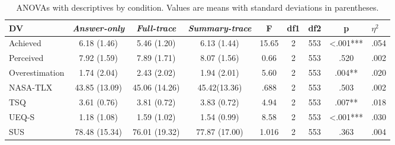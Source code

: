 \documentclass[manuscript,review,anonymous]{acmart}
\begin{document}
\begin{table}[!htp]
\centering
\caption{ANOVAs with descriptives by condition. Values are means with standard deviations in parentheses.}

\begin{tabular}{lcccccccc}
\hline
DV                    & \textit{Answer-only}             & \textit{Full-trace}                 & \textit{Summary-trace} & F & df1 & df2 & p & \multicolumn{1}{l}{$\eta^2$} \\ \hline
Achieved  &    6.18 (1.46)      &      5.46 (1.20)     &      6.13 (1.44)           &       15.65           &              2        &      553                &      <.001***           &            .054         \\
Perceived &    7.92 (1.59)      &      7.89 (1.71)     &      8.07 (1.56)          &       0.66       &             2           &       553             &        .520       &           .002       \\
Overestimation &    1.74 (2.04)      &        2.43 (2.02)    &        1.94 (2.01)          &     5.60             &             2         &     553                &      .004**            &           .020           \\
NASA-TLX     & 43.85 (13.09)  & 45.06 (14.26)  & 45.42(13.36)  &  .688 & 2 & 553 & .503 & .002  \\
TSQ                     & 3.61 (0.76)  & 3.81 (0.72)  & 3.83 (0.72)  & 4.94  & 2 & 553 & .007** & .018  \\                UEQ-S                     & 1.18 (1.08)  & 1.59 (1.02)  & 1.54 (0.99)  & 8.58  & 2 & 553 & <.001*** & .030  \\
SUS                     & 78.48 (15.34)  & 76.01 (19.32)  &  77.87 (17.00) & 1.016 & 2 & 553 & .363 & .004  \\


\hline
\end{tabular}





\end{table}
\end{document}
